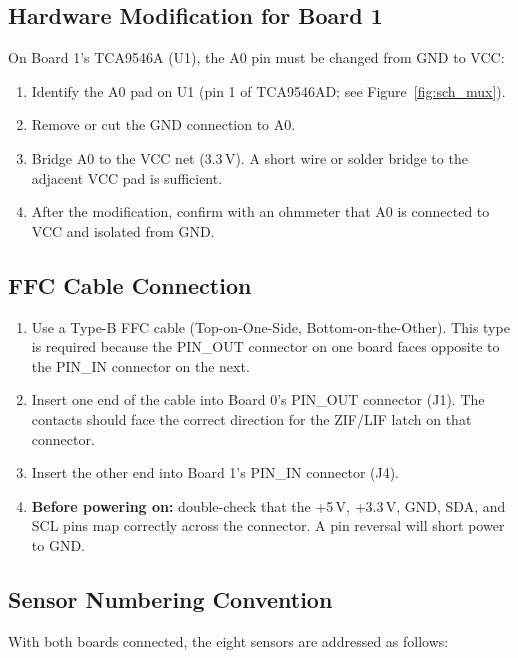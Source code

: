 \documentclass[12pt]{article}
\begin{document}
\subsection{Hardware Modification for Board 1}

On Board 1's TCA9546A (U1), the A0 pin must be changed from GND to VCC:

\begin{enumerate}
  \item Identify the A0 pad on U1 (pin 1 of TCA9546AD; see
        Figure~\ref{fig:sch_mux}).
  \item Remove or cut the GND connection to A0.
  \item Bridge A0 to the VCC net (3.3\,V). A short wire or solder
        bridge to the adjacent VCC pad is sufficient.
  \item After the modification, confirm with an ohmmeter that A0 is
        connected to VCC and isolated from GND.
\end{enumerate}

\subsection{FFC Cable Connection}

\begin{enumerate}
  \item Use a Type-B FFC cable (Top-on-One-Side, Bottom-on-the-Other).
        This type is required because the PIN\_OUT connector on one board
        faces opposite to the PIN\_IN connector on the next.
  \item Insert one end of the cable into Board 0's PIN\_OUT connector (J1).
        The contacts should face the correct direction for the ZIF/LIF latch
        on that connector.
  \item Insert the other end into Board 1's PIN\_IN connector (J4).
  \item \textbf{Before powering on:} double-check that the +5\,V, +3.3\,V,
        GND, SDA, and SCL pins map correctly across the connector. A pin
        reversal will short power to GND.
\end{enumerate}

\subsection{Sensor Numbering Convention}

With both boards connected, the eight sensors are addressed as follows:
\end{document}
